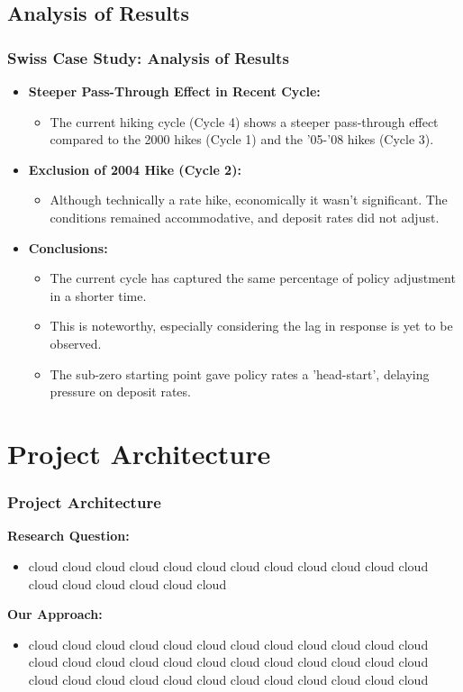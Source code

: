 \documentclass{beamer}
\begin{document}
\subsection{Analysis of Results}
\begin{frame}
\frametitle{Swiss Case Study: Analysis of Results}
\begin{itemize}
    \item \textbf{Steeper Pass-Through Effect in Recent Cycle:}
    \begin{itemize}
        \item The current hiking cycle (Cycle 4) shows a steeper pass-through effect compared to the 2000 hikes (Cycle 1) and the '05-'08 hikes (Cycle 3).
    \end{itemize}
        \item \textbf{Exclusion of 2004 Hike (Cycle 2):}
    \begin{itemize}
        \item Although technically a rate hike, economically it wasn't significant. The conditions remained accommodative, and deposit rates did not adjust.
    \end{itemize}
        \item \textbf{Conclusions:}
    \begin{itemize}
        \item The current cycle has captured the same percentage of policy adjustment in a shorter time.
        \item This is noteworthy, especially considering the lag in response is yet to be observed.
        \item The sub-zero starting point gave policy rates a 'head-start', delaying pressure on deposit rates.
    \end{itemize}
\end{itemize}
\end{frame}

\section{Project Architecture}
\begin{frame}
\frametitle{Project Architecture}
\textbf{Research Question:}
\begin{itemize}
  \item cloud cloud cloud cloud cloud cloud cloud cloud cloud cloud cloud cloud cloud cloud cloud cloud cloud cloud
\end{itemize}

\textbf{Our Approach:}
\begin{itemize}
  \item cloud cloud cloud cloud cloud cloud cloud cloud cloud cloud cloud cloud cloud cloud cloud cloud cloud cloud cloud cloud cloud cloud cloud cloud cloud cloud cloud cloud cloud cloud cloud cloud cloud cloud cloud cloud
\end{itemize}
\end{frame}
\end{document}
